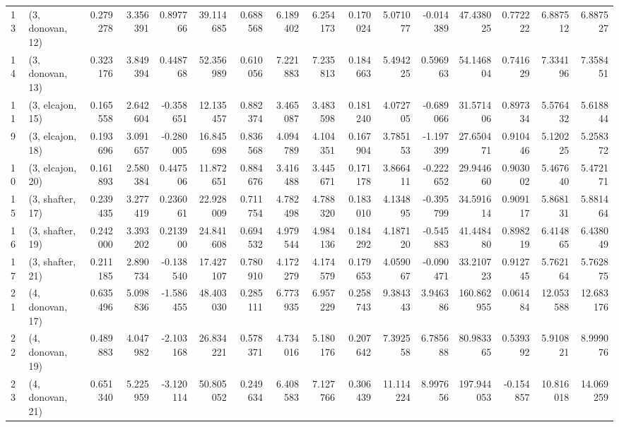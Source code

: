 \begin{tabular}{llrrrrrrrrrrrrrr}
13 &  (3, donovan, 12) &   0.279278 &  3.356391 &  0.897766 &  39.114685 &  0.688568 &   6.189402 &  6.254173 &  0.170024 &   5.071077 & -0.014389 &   47.438025 &  0.772222 &   6.887512 &   6.887527 \\
14 &  (3, donovan, 13) &   0.323176 &  3.849394 &  0.448768 &  52.356989 &  0.610056 &   7.221883 &  7.235813 &  0.184663 &   5.494225 &  0.596963 &   54.146804 &  0.741629 &   7.334196 &   7.358451 \\
11 &  (3, elcajon, 15) &   0.165558 &  2.642604 & -0.358651 &  12.135457 &  0.882374 &   3.465087 &  3.483598 &  0.181240 &   4.072705 & -0.689066 &   31.571406 &  0.897334 &   5.576432 &   5.618844 \\
9  &  (3, elcajon, 18) &   0.193696 &  3.091657 & -0.280005 &  16.845698 &  0.836568 &   4.094789 &  4.104351 &  0.167904 &   3.785153 & -1.197399 &   27.650471 &  0.910446 &   5.120225 &   5.258372 \\
10 &  (3, elcajon, 20) &   0.161893 &  2.580384 &  0.447506 &  11.872651 &  0.884676 &   3.416488 &  3.445671 &  0.171178 &   3.866411 & -0.222652 &   29.944660 &  0.903002 &   5.467640 &   5.472171 \\
15 &  (3, shafter, 17) &   0.239435 &  3.277419 &  0.236061 &  22.928009 &  0.711754 &   4.782498 &  4.788320 &  0.183010 &   4.134895 & -0.395799 &   34.591614 &  0.909117 &   5.868131 &   5.881464 \\
16 &  (3, shafter, 19) &   0.242000 &  3.393202 &  0.213900 &  24.841608 &  0.694532 &   4.979544 &  4.984136 &  0.184292 &   4.187120 & -0.545883 &   41.448480 &  0.898219 &   6.414865 &   6.438049 \\
17 &  (3, shafter, 21) &   0.211185 &  2.890734 & -0.138540 &  17.427107 &  0.780910 &   4.172279 &  4.174579 &  0.179653 &   4.059067 & -0.090471 &   33.210723 &  0.912745 &   5.762164 &   5.762875 \\
21 &  (4, donovan, 17) &   0.635496 &  5.098836 & -1.586455 &  48.403030 &  0.285111 &   6.773935 &  6.957229 &  0.258743 &   9.384343 &  3.946386 &  160.862955 &  0.061484 &  12.053588 &  12.683176 \\
22 &  (4, donovan, 19) &   0.489883 &  4.047982 & -2.103168 &  26.834221 &  0.578371 &   4.734016 &  5.180176 &  0.207642 &   7.392558 &  6.785688 &   80.983365 &  0.539392 &   5.910821 &   8.999076 \\
23 &  (4, donovan, 21) &   0.651340 &  5.225959 & -3.120114 &  50.805052 &  0.249634 &   6.408583 &  7.127766 &  0.306439 &  11.114224 &  8.997656 &  197.944053 & -0.154857 &  10.816018 &  14.069259 \\

\end{tabular}
